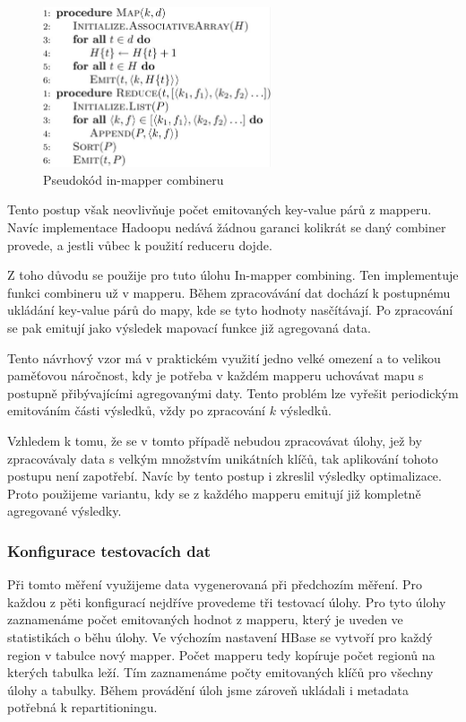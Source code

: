 \documentclass[thesis=M,czech]{FITthesis}[2012/06/26]
\begin{document}
\begin{figure}[h]\centering
	\includegraphics[width=0.6\textwidth, angle=0]{files/inmap}
	\caption[Pseudokód in-mapper combineru]
	{Pseudokód in-mapper combineru\cite{inmemory}}\label{fig:inmap}
\end{figure}
Tento postup však neovlivňuje počet emitovaných  key-value párů z mapperu. Navíc  implementace Hadoopu nedává žádnou garanci kolikrát se daný combiner provede, a jestli vůbec k použití reduceru dojde. 

Z toho důvodu se použije pro tuto úlohu In-mapper combining. Ten implementuje funkci combineru už v mapperu. Během zpracovávání dat dochází k postupnému ukládání key-value párů do mapy, kde se tyto hodnoty nasčítávají. Po zpracování se pak emitují jako výsledek mapovací funkce již agregovaná data.

Tento návrhový vzor má v praktickém využití jedno velké omezení a to velikou paměťovou náročnost, kdy je potřeba v každém mapperu uchovávat mapu s postupně přibývajícími agregovanými daty. Tento problém lze vyřešit periodickým emitováním části výsledků, vždy po zpracování $k$ výsledků. 

Vzhledem k tomu, že se v tomto případě nebudou zpracovávat úlohy, jež by zpracovávaly data s velkým množstvím unikátních klíčů, tak aplikování tohoto postupu není zapotřebí. Navíc by tento postup i zkreslil výsledky optimalizace. Proto použijeme variantu, kdy se z každého mapperu emitují již kompletně agregované výsledky.

\subsubsection{Konfigurace testovacích dat}
Při tomto měření využijeme data vygenerovaná při předchozím měření. Pro každou z pěti konfigurací nejdříve provedeme tři testovací úlohy. Pro tyto úlohy zaznamenáme počet emitovaných hodnot z mapperu, který je uveden ve statistikách o běhu úlohy. Ve výchozím nastavení HBase se vytvoří pro každý region v tabulce nový mapper. Počet mapperu tedy kopíruje počet regionů na kterých tabulka leží. Tím zaznamenáme počty emitovaných klíčů pro všechny úlohy a tabulky. Během provádění úloh jsme zároveň ukládali i metadata potřebná k repartitioningu.
\end{document}
